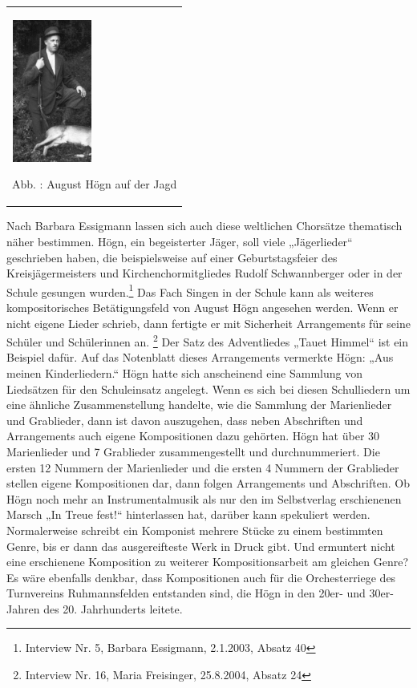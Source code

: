\documentclass[a4paper]{article}
\newcounter{Abb}
\renewcommand\theAbb{\arabic{Abb}}
\begin{document}
\begin{flushleft}
\tablefirsthead{}
\tablehead{}
\tabletail{}
\tablelasttail{}
\begin{supertabular}{m{2.809cm}}

\begin{center}

\includegraphics[width=2.626cm,height=4.68cm]{pictures/zulassungsarbeit-img068.jpg}

\end{center}
Abb. \stepcounter{Abb}{\theAbb}: August Högn auf der Jagd\\
\end{supertabular}
\end{flushleft}
Nach Barbara Essigmann lassen sich auch diese weltlichen Chorsätze
thematisch näher bestimmen. Högn, ein begeisterter Jäger, soll viele
„Jägerlieder“ geschrieben haben, die beispielsweise auf einer
Geburtstagsfeier des Kreisjägermeisters und Kirchenchormitgliedes
Rudolf Schwannberger oder in der Schule gesungen wurden.\footnote{
Interview Nr. 5, Barbara Essigmann, 2.1.2003, Absatz 40} Das Fach
Singen in der Schule kann als weiteres kompositorisches Betätigungsfeld
von August Högn angesehen werden. Wenn er nicht eigene Lieder schrieb,
dann fertigte er mit Sicherheit Arrangements für seine Schüler und
Schülerinnen an. \footnote{Interview Nr. 16, Maria Freisinger,
25.8.2004, Absatz 24} Der Satz des Adventliedes „Tauet Himmel“ ist ein
Beispiel dafür. Auf das Notenblatt dieses Arrangements vermerkte Högn:
„Aus meinen Kinderliedern.“ Högn hatte sich anscheinend eine Sammlung
von Liedsätzen für den Schuleinsatz angelegt. Wenn es sich bei diesen
Schulliedern um eine ähnliche Zusammenstellung handelte, wie die
Sammlung der Marienlieder und Grablieder, dann ist davon auszugehen,
dass neben Abschriften und Arrangements auch eigene Kompositionen dazu
gehörten. Högn hat über 30 Marienlieder und 7 Grablieder
zusammengestellt und durchnummeriert. Die ersten 12 Nummern der
Marienlieder und die ersten 4 Nummern der Grablieder stellen eigene
Kompositionen dar, dann folgen Arrangements und Abschriften. Ob Högn
noch mehr an Instrumentalmusik als nur den im Selbstverlag erschienenen
Marsch „In Treue fest!“ hinterlassen hat, darüber kann spekuliert
werden. Normalerweise schreibt ein Komponist mehrere Stücke zu einem
bestimmten Genre, bis er dann das ausgereifteste Werk in Druck gibt.
Und ermuntert nicht eine erschienene Komposition zu weiterer
Kompositionsarbeit am gleichen Genre? Es wäre ebenfalls denkbar, dass
Kompositionen auch für die Orchesterriege des Turnvereins
Ruhmannsfelden entstanden sind, die Högn in den 20er- und 30er-Jahren
des 20. Jahrhunderts leitete.
\end{document}
